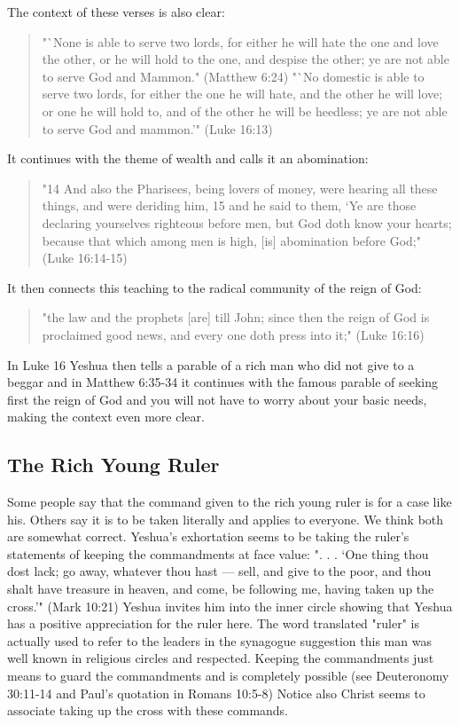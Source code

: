 \documentclass[11pt]{article}
\begin{document}
The context of these verses is also clear:
\begin{quote}
"`None is able to serve two lords, for either he will hate the one and love the other, or he will hold to the one, and despise the other; ye are not able to serve God and Mammon." (Matthew 6:24)
"`No domestic is able to serve two lords, for either the one he will hate, and the other he will love; or one he will hold to, and of the other he will be heedless; ye are not able to serve God and mammon.'" (Luke 16:13)
\end{quote}
It continues with the theme of wealth and calls it an abomination:
\begin{quote}
"14 And also the Pharisees, being lovers of money, were hearing all these things, and were deriding him, 15 and he said to them, `Ye are those declaring yourselves righteous before men, but God doth know your hearts; because that which among men is high, [is] abomination before God;" (Luke 16:14-15)
\end{quote}
It then connects this teaching to the radical community of the reign of God:
\begin{quote}
"the law and the prophets [are] till John; since then the reign of God is proclaimed good news, and every one doth press into it;" (Luke 16:16)
\end{quote}
In Luke 16 Yeshua then tells a parable of a rich man who did not give to a beggar and in Matthew 6:35-34 it continues with the famous parable of seeking first the reign of God and you will not have to worry about your basic needs, making the context even more clear. 

\subsection{The Rich Young Ruler}
Some people say that the command given to the rich young ruler is for a case like his. Others say it is to be taken literally and applies to everyone. We think both are somewhat correct. Yeshua's exhortation seems to be taking the ruler's statements of keeping the commandments at face value: ". . . ‘One thing thou dost lack; go away, whatever thou hast — sell, and give to the poor, and thou shalt have treasure in heaven, and come, be following me, having taken up the cross.’" (Mark 10:21) Yeshua invites him into the inner circle showing that Yeshua has a positive appreciation for the ruler here. The word translated "ruler" is actually used to refer to the leaders in the synagogue suggestion this man was well known in religious circles and respected. Keeping the commandments just means to guard the commandments \cite{keep meaning} and is completely possible (see Deuteronomy 30:11-14 and Paul's quotation in Romans 10:5-8) 
 Notice also Christ seems to associate taking up the cross with these commands.
\end{document}
